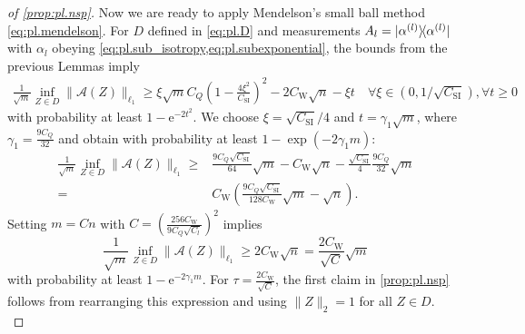 \begin{proof}[of \cref{prop:pl.nsp}]
  Now we are ready to apply Mendelson's small ball method \eqref{eq:pl.mendelson}.
  For $D$ defined in \eqref{eq:pl.D} and measurements $ A_l = \ketbra{\alpha\ind{l}}$ with $\alpha_l$ obeying \cref{eq:pl.sub_isotropy,eq:pl.subexponential}, the bounds from the previous Lemmas imply
  \begin{align}
    \frac{1}{\sqrt{m}}\inf_{ Z \in D} \|\mathcal{A}( Z) \|_{\ell_1} \geq \xi \sqrt{m} C_Q \left( 1- \frac{4 \xi^2}{C_\mathrm{SI}} \right)^2 - 2 C_\mathrm{W} \sqrt{n} - \xi t \quad \forall \xi \in (0, 1/\sqrt{C_\mathrm{SI}}), \forall t \geq 0
  \end{align}
  with probability at least $1- \mathrm{e}^{-2t^2}$. We choose $\xi = \sqrt{C_\mathrm{SI}}/4$ and $t = \gamma_1 \sqrt{m}$, where $\gamma_1 = \frac{9 C_Q}{32}$ and obtain with probability at least $1-\exp \left( -2 \gamma_1 m \right)$:
  \begin{align}
    \frac{1}{\sqrt{m}}\inf_{ Z \in D} \|\mathcal{A}( Z) \|_{\ell_1} \geq & \frac{9 C_Q\sqrt{C_\mathrm{SI}}}{64} \sqrt{m} -  C_\mathrm{W}\sqrt{n} - \frac{\sqrt{C_\mathrm{SI}}}{4} \frac{9 C_Q}{32} \sqrt{m} \\
    = & C_\mathrm{W} \left( \frac{9 C_Q \sqrt{C_\mathrm{SI}}}{128 C_\mathrm{W}} \sqrt{m} - \sqrt{n} \right).
  \end{align}
  Setting $m = C n$ with $C = \left( \frac{256 C_\mathrm{W}}{9 C_Q \sqrt{C_l}} \right)^2$ implies
  \[
    \frac{1}{\sqrt{m}} \inf_{ Z \in D} \| \mathcal{A}( Z) \|_{\ell_1} \geq 2 C_\mathrm{W} \sqrt{n} = \frac{2 C_\mathrm{W}}{\sqrt{C}} \sqrt{m}
  \]
  with probability at least $1- \mathrm{e}^{-2 \gamma_1 m}$.
  For $\tau = \frac{ 2 C_\mathrm{W}}{\sqrt{C}}$, the first claim in \cref{prop:pl.nsp} follows from rearranging this expression and using $\|  Z \|_2=1$ for all $ Z \in D$.\\



\end{proof}
